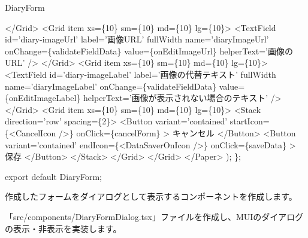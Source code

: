 \begin{starterprogram}[]{DiaryForm}
{          \textless{}/Grid\textgreater{}
          \textless{}Grid item xs=\{10\} sm=\{10\} md=\{10\} lg=\{10\}\textgreater{}
            \textless{}TextField
              id='diary{-}imageUrl'
              label='画像URL'
              fullWidth
              name='diaryImageUrl'
              onChange=\{validateFieldData\}
              value=\{onEditImageUrl\}
              helperText='画像のURL'
            /\textgreater{}
          \textless{}/Grid\textgreater{}
          \textless{}Grid item xs=\{10\} sm=\{10\} md=\{10\} lg=\{10\}\textgreater{}
            \textless{}TextField
              id='diary{-}imageLabel'
              label='画像の代替テキスト'
              fullWidth
              name='diaryImageLabel'
              onChange=\{validateFieldData\}
              value=\{onEditImageLabel\}
              helperText='画像が表示されない場合のテキスト'
            /\textgreater{}
          \textless{}/Grid\textgreater{}
          \textless{}Grid item xs=\{10\} sm=\{10\} md=\{10\} lg=\{10\}\textgreater{}
            \textless{}Stack direction='row' spacing=\{2\}\textgreater{}
              \textless{}Button
                variant='contained'
                startIcon=\{\textless{}CancelIcon /\textgreater{}\}
                onClick=\{cancelForm\}
              \textgreater{}
                キャンセル
              \textless{}/Button\textgreater{}
              \textless{}Button
                variant='contained'
                endIcon=\{\textless{}DataSaverOnIcon /\textgreater{}\}
                onClick=\{saveData\}
              \textgreater{}
                保存
              \textless{}/Button\textgreater{}
            \textless{}/Stack\textgreater{}
          \textless{}/Grid\textgreater{}
        \textless{}/Grid\textgreater{}
      \textless{}/Paper\textgreater{}
    );
  \};

  export default DiaryForm;
}\end{starterprogram}

作成したフォームをダイアログとして表示するコンポーネントを作成します。

\vspace*{\baselineskip}

「src/components/DiaryFormDialog.tsx」ファイルを作成し、MUIのダイアログの表示・非表示を実装します。

